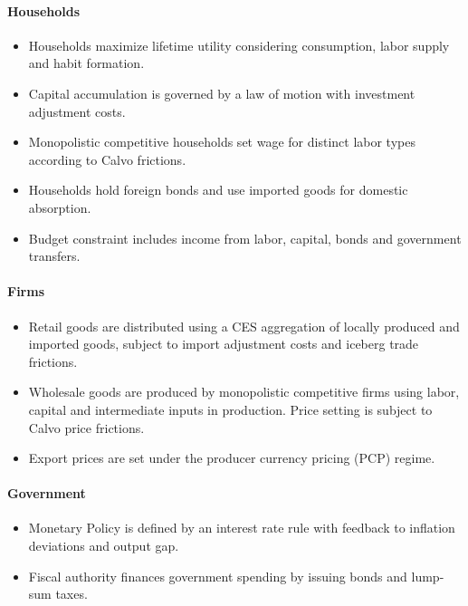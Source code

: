 \paragraph{Households}
\begin{itemize}[itemsep=0pt, topsep=0pt, partopsep=0pt, parsep=0pt]
  \item Households maximize lifetime utility considering consumption, labor supply and habit formation.
  \item Capital accumulation is governed by a law of motion with investment adjustment costs.
  \item Monopolistic competitive households set wage for distinct labor types according to Calvo frictions.
  \item Households hold foreign bonds and use imported goods for domestic absorption.
  \item Budget constraint includes income from labor, capital, bonds and government transfers.  
\end{itemize}

\paragraph{Firms}
\begin{itemize}[itemsep=0pt, topsep=0pt, partopsep=0pt, parsep=0pt]
  \item Retail goods are distributed using a CES aggregation of locally produced and imported goods, subject to import adjustment costs and iceberg trade frictions.
  \item Wholesale goods are produced by monopolistic competitive firms using labor, capital and intermediate inputs in production.
  Price setting is subject to Calvo price frictions.
  \item Export prices are set under the producer currency pricing (PCP) regime.
\end{itemize}

\paragraph{Government}
\begin{itemize}[itemsep=0pt, topsep=0pt, partopsep=0pt, parsep=0pt]
  \item Monetary Policy is defined by an interest rate rule with feedback to inflation deviations and output gap.
  \item Fiscal authority finances government spending by issuing bonds and lump-sum taxes.
\end{itemize}

